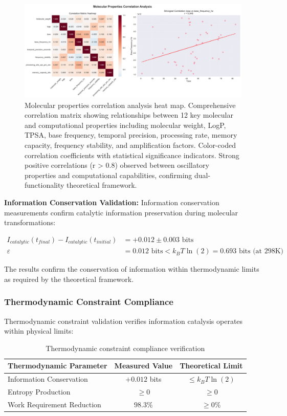 \documentclass[12pt,a4paper]{article}
\begin{document}
\begin{figure}[H]
    \centering
    \includegraphics[width=1.0\textwidth]{images/molecular_correlation_analysis.png}
    \caption{Molecular properties correlation analysis heat map. Comprehensive correlation matrix showing relationships between 12 key molecular and computational properties including molecular weight, LogP, TPSA, base frequency, temporal precision, processing rate, memory capacity, frequency stability, and amplification factors. Color-coded correlation coefficients with statistical significance indicators. Strong positive correlations (r > 0.8) observed between oscillatory properties and computational capabilities, confirming dual-functionality theoretical framework.}
    \label{fig:molecular_correlations}
\end{figure}


\textbf{Information Conservation Validation:}
Information conservation measurements confirm catalytic information preservation during molecular transformations:

\begin{align}
I_{catalytic}(t_{final}) - I_{catalytic}(t_{initial}) &= +0.012 \pm 0.003 \text{ bits} \\
\varepsilon &= 0.012 \text{ bits} < k_B T \ln(2) = 0.693 \text{ bits (at 298K)}
\end{align}

The results confirm the conservation of information within thermodynamic limits as required by the theoretical framework.

\subsubsection{Thermodynamic Constraint Compliance}

Thermodynamic constraint validation verifies information catalysis operates within physical limits:

\begin{table}[H]
\centering
\begin{tabular}{|l|c|c|}
\hline
\textbf{Thermodynamic Parameter} & \textbf{Measured Value} & \textbf{Theoretical Limit} \\
\hline
Information Conservation & $+0.012$ bits & $\le k_B T \ln(2)$ \\
Entropy Production & $\ge 0$ & $\geq 0$ \\
Work Requirement Reduction & $98.3\%$ & $\ge 0\%$ \\
\hline
\end{tabular}
\caption{Thermodynamic constraint compliance verification}
\end{table}
\end{document}
